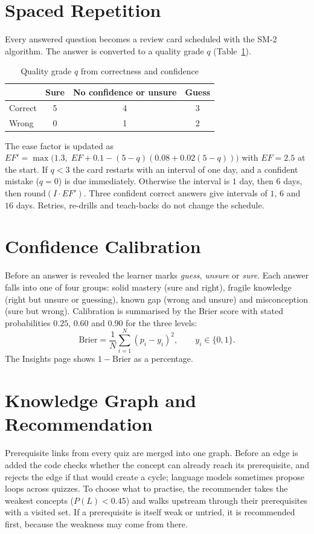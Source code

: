 \section{Spaced Repetition}
Every answered question becomes a review card scheduled with the SM-2 algorithm. The answer is converted to a quality grade $q$ (Table~\ref{tab:sm2}).

\begin{table}[H]
\centering
\begin{tabular}{lccc}
\toprule
 & Sure & No confidence or unsure & Guess \\
\midrule
Correct & 5 & 4 & 3 \\
Wrong & 0 & 1 & 2 \\
\bottomrule
\end{tabular}
\caption{Quality grade $q$ from correctness and confidence}
\label{tab:sm2}
\end{table}

The ease factor is updated as $EF' = \max\bigl(1.3,\;EF + 0.1 - (5-q)(0.08 + 0.02(5-q))\bigr)$ with $EF=2.5$ at the start. If $q<3$ the card restarts with an interval of one day, and a confident mistake ($q=0$) is due immediately. Otherwise the interval is $1$ day, then $6$ days, then $\mathrm{round}(I \cdot EF')$. Three confident correct answers give intervals of $1$, $6$ and $16$ days. Retries, re-drills and teach-backs do not change the schedule.

\section{Confidence Calibration}
Before an answer is revealed the learner marks \emph{guess}, \emph{unsure} or \emph{sure}. Each answer falls into one of four groups: solid mastery (sure and right), fragile knowledge (right but unsure or guessing), known gap (wrong and unsure) and misconception (sure but wrong). Calibration is summarised by the Brier score with stated probabilities $0.25$, $0.60$ and $0.90$ for the three levels:
\[
\mathrm{Brier} = \frac{1}{N}\sum_{i=1}^{N}(p_i - y_i)^2,\qquad y_i\in\{0,1\}.
\]
The Insights page shows $1-\mathrm{Brier}$ as a percentage.

\section{Knowledge Graph and Recommendation}
Prerequisite links from every quiz are merged into one graph. Before an edge is added the code checks whether the concept can already reach its prerequisite, and rejects the edge if that would create a cycle; language models sometimes propose loops across quizzes. To choose what to practise, the recommender takes the weakest concepts ($P(L)<0.45$) and walks upstream through their prerequisites with a visited set. If a prerequisite is itself weak or untried, it is recommended first, because the weakness may come from there.

